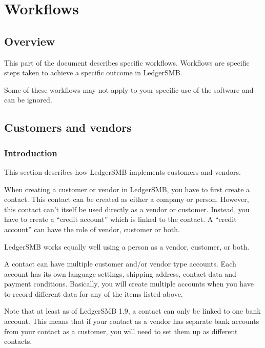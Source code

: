 
\part{Workflows}
\label{part-workflows}

\chapter{Overview}
\label{cha-workflows-overview}

This part of the document describes specific workflows.  Workflows are specific steps
taken to achieve a specific outcome in LedgerSMB.

Some of these workflows may not apply to your specific use of the software and
can be ignored.

\chapter{Customers and vendors}
\label{cha-workflows-customers}

\section{Introduction}
\label{sec-workflows-customers-intro}

This section describes
how LedgerSMB implements \glspl{customer} and \glspl{vendor}.

When creating a customer or vendor in LedgerSMB, you have to first create a \gls{contact}. 
This contact can be created as either a \gls{company} or person.
However, this contact
can't itself be used directly as a \gls{vendor} or \gls{customer}. Instead, you have to create a ``\gls{credit account}''
which is linked to the contact. A ``\gls{credit account}'' can have the role of vendor, customer or both.

LedgerSMB works equally well using a person as a vendor, customer, or both.

A contact can have multiple \gls{customer} and/or \gls{vendor} type accounts. Each account has its
own language settings, shipping address, contact data and payment conditions.
Basically, you will create multiple accounts when you have to record different data
for any of the items listed above.

Note that at least as of LedgerSMB 1.9, a contact can only be linked to one bank account.  This means that if your contact as a vendor has separate bank accounts from your contact as a \gls{customer}, you will need to set them up as different contacts.

